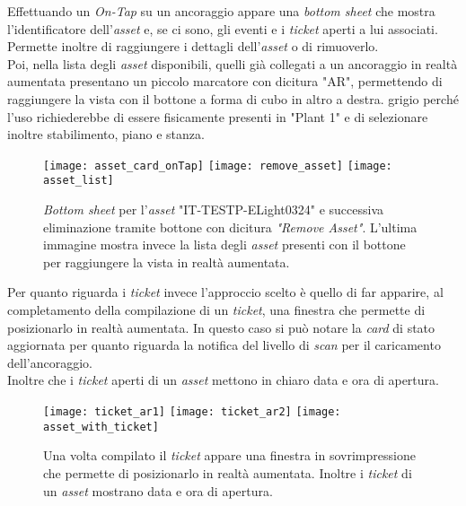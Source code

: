 Effettuando un \textit{On-Tap} su un ancoraggio appare una \textit{bottom sheet} che mostra l'identificatore dell'\textit{asset} e, se ci sono, gli eventi e i \textit{ticket} aperti a lui associati. Permette inoltre di raggiungere i dettagli dell'\textit{asset} o di rimuoverlo.\\
Poi, nella lista degli \textit{asset} disponibili, quelli già collegati a un ancoraggio in realtà aumentata presentano un piccolo marcatore con dicitura "AR", permettendo di raggiungere la vista con il bottone a forma di cubo in altro a destra. \e grigio perché l'uso richiederebbe di essere fisicamente presenti in "Plant 1" e di selezionare inoltre stabilimento, piano e stanza.

\begin{figure}[H]
  \centering
  \texttt{[image: asset\_card\_onTap]}\hfill
  \texttt{[image: remove\_asset]}\hfill
  \texttt{[image: asset\_list]}
  \caption[\textit{Bottom sheet asset} per eliminazione e lista \textit{asset}]{\textit{Bottom sheet} per l'\textit{asset} "IT-TESTP-ELight0324" e successiva eliminazione tramite bottone con dicitura \textit{"Remove Asset"}. L'ultima immagine mostra invece la lista degli \textit{asset} presenti con il bottone per raggiungere la vista in realtà aumentata.}
  \label{fig:asset_list}
\end{figure}

Per quanto riguarda i \textit{ticket} invece l'approccio scelto è quello di far apparire, al completamento della compilazione di un \textit{ticket}, una finestra che permette di posizionarlo in realtà aumentata. In questo caso si può notare la \textit{card} di stato aggiornata per quanto riguarda la notifica del livello di \textit{scan} per il caricamento dell'ancoraggio.\\
Inoltre che i \textit{ticket} aperti di un \textit{asset} mettono in chiaro data e ora di apertura.

\begin{figure}[H]
  \centering
  \texttt{[image: ticket\_ar1]}\hfill
  \texttt{[image: ticket\_ar2]}\hfill
  \texttt{[image: asset\_with\_ticket]}
  \caption[Caricamento \textit{ticket} realtà aumentata e \textit{ticket} su \textit{asset}]{Una volta compilato il \textit{ticket} appare una finestra in sovrimpressione che permette di posizionarlo in realtà aumentata. Inoltre i \textit{ticket} di un \textit{asset} mostrano data e ora di apertura.}
  \label{fig:ticket_ar}
\end{figure}


